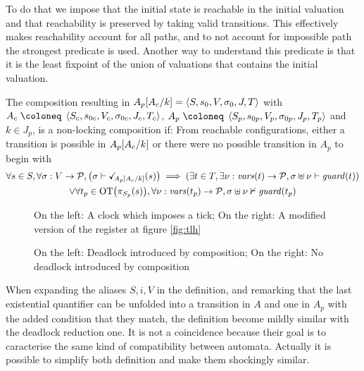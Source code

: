 \documentclass{article}
\begin{document}
To do that we impose that the initial state is reachable in the initial valuation and that reachability is preserved by taking valid transitions.
This effectively makes reachability account for all paths, and to not account for impossible path the strongest predicate is used.
Another way to understand this predicate is that it is the least fixpoint of the union of valuations that contains the initial valuation.
\begin{defi}
The composition resulting in \(A_p{\left[A_c\middle/k\right]} = \left<S,s_0,V,\sigma_0,J,T\right>\) with \(A_c \defobject \OA{S_c}{s_{0c}}{V_c}{\sigma_{0c}}{J_c}{T_c}\), \(A_p \defobject \OA{S_p}{s_{0p}}{V_p}{\sigma_{0p}}{J_p}{T_p}\) and \(k \in J_p\), is a non-locking composition if:
 From reachable configurations, either a transition is possible in \(A_p{\left[A_c\middle/k\right]}\) or there were no possible transition in \(A_p\) to begin with
\begin{multline*}
	\forall s \in S, \forall \sigma: V \to \mathcal{P}, {\left(\sigma \vdash \checkmark_{\!\! A_p{\left[A_c\middle/k\right]}}{\left(s\right)}\right)} \implies {\left(\exists t \in T, \exists \nu: \mathit{vars}{\left(t\right)} \to \mathcal{P}, \sigma \uplus \nu \vdash \mathit{guard}{\left(t\right)}\right)} \\
	\vee \forall t_p \in \mathrm{OT}{\left(\pi_{S_p}{\left(s\right)}\right)}, \forall \nu: \mathit{vars}{\left(t_p\right)} \to \mathcal{P}, \sigma \uplus \nu \nvdash \mathit{guard}{\left(t_p\right)}
\end{multline*}
\end{defi}

\begin{exi}
\begin{figure}

\vrule

\caption{On the left: A clock which imposes a tick; On the right: A modified version of the register at figure \ref{fig:tlh}}
\label{fig:anytick}
\end{figure}
\begin{figure}

\vrule

\caption{On the left: Deadlock introduced by composition; On the right: No deadlock introduced by composition}
\label{fig:deadlock}
\end{figure}
\end{exi}

When expanding the aliases \(S, i, V\) in the definition, and remarking that the last existential quantifier can be unfolded into a transition in \(A\) and one in \(A_p\) with the added condition that they match, the definition become mildly similar with the deadlock reduction one.
It is not a coincidence because their goal is to caracterise the same kind of compatibility between automata.
Actually it is possible to simplify both definition and make them shockingly similar.
\end{document}
